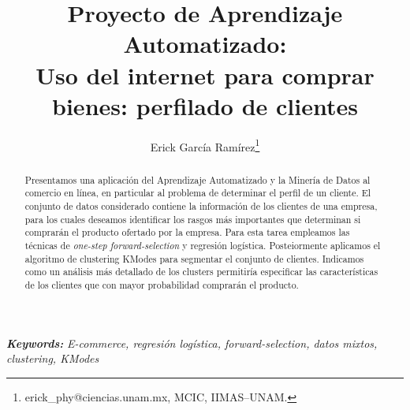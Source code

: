\documentclass[letterpaper,11pt]{article}
\providecommand{\keywords}[1]{\textbf{\small \textit{Keywords:}} {\small\em #1}}
\begin{document}
\title{Proyecto de Aprendizaje Automatizado:\\
{\Large Uso del internet para comprar bienes: perfilado de clientes}}
\author{Erick García Ramírez\footnote{
erick\_phy@ciencias.unam.mx, MCIC, IIMAS--UNAM.}}

\maketitle
\begin{abstract}
    \noindent Presentamos una aplicación del Aprendizaje Automatizado y la Minería de Datos al comercio en línea, en
    particular al problema de determinar el perfil de un cliente. El conjunto de datos considerado contiene la
    información de los clientes de una empresa, para los cuales deseamos identificar los rasgos 
    más importantes que determinan si comprarán el producto ofertado por la empresa. Para esta tarea empleamos las técnicas de
\emph{one-step forward-selection} y regresión logística.  Posteiormente aplicamos el algoritmo de clustering KModes para
segmentar el conjunto de clientes. Indicamos como un análisis más detallado de los clusters permitiría especificar 
las características de los clientes que con mayor probabilidad comprarán el producto.
\end{abstract}
\keywords{E-commerce, regresión logística, forward-selection, datos mixtos, clustering, KModes}

\vspace{\baselineskip}
\end{document}
